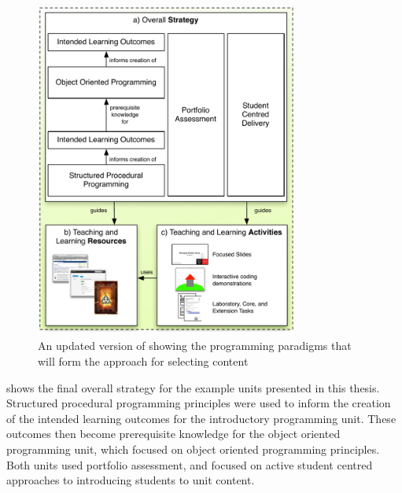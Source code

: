 \begin{figure}[htp]
	\centering
	\includegraphics[width=0.77\textwidth]{OverallStrategy}
	\caption{An updated version of  showing the programming paradigms that will form the approach for selecting content}
	\label{fig:final_overall_strategy}
\end{figure}

 shows the final overall strategy for the example units presented in this thesis. Structured procedural programming principles were used to inform the creation of the intended learning outcomes for the introductory programming unit. These outcomes then become prerequisite knowledge for the object oriented programming unit, which focused on object oriented programming principles. Both units used portfolio assessment, and focused on active student centred approaches to introducing students to unit content.


